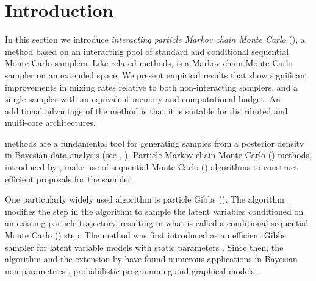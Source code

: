 
\section{Introduction}
\label{sec:ipmcmc:intro}

In this section we introduce \emph{interacting particle Markov chain Monte Carlo} (\ipmcmc), a \pmcmc method based on an interacting pool of standard and conditional sequential Monte Carlo samplers. Like related methods, \ipmcmc is a Markov chain Monte Carlo sampler on an extended space. We present empirical results that show significant improvements in mixing rates relative to both non-interacting \pmcmc samplers, and a single \pmcmc sampler with an equivalent memory and computational budget. 
An additional advantage of the \ipmcmc method is that it is suitable for distributed and multi-core architectures.  

\mcmc methods are a fundamental tool for generating samples from a posterior density in Bayesian data analysis (see \eg, \citet{robert2013monte}). Particle Markov chain Monte Carlo (\pmcmc) methods, introduced by \citet{andrieuDH2010}, make use of sequential Monte Carlo (\smc) algorithms \citep{gordon1993novel,doucet2001sequential} to construct efficient proposals for the \mcmc sampler. 

One particularly widely used \pmcmc algorithm is particle Gibbs (\pg). The \pg algorithm modifies the \smc step in the \pmcmc algorithm to sample the latent variables conditioned on an existing particle trajectory, resulting in what is called a conditional sequential Monte Carlo (\csmc) step. The \pg method was first introduced as an efficient Gibbs sampler for latent variable models with static parameters \citep{andrieuDH2010}. Since then, the \pg algorithm and the extension by \citet{lindstenJS2014} have found numerous applications in \eg Bayesian non-parametrics \citep{ValeraFSPC2015,tripuraneni2015}, probabilistic programming \citep{wood2014new,vandemeent_aistats_2015} and graphical models \citep{everitt2012,naessethLS2014,naessethLS2015nested}.  

